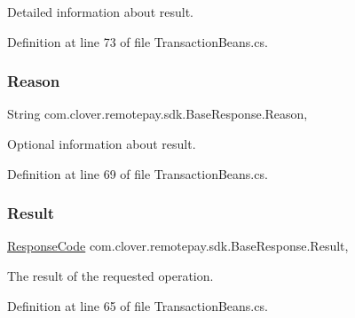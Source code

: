 Detailed information about result. 



Definition at line 73 of file Transaction\+Beans.\+cs.

\mbox{\label{classcom_1_1clover_1_1remotepay_1_1sdk_1_1_base_response_a7d7f71bc43c375b70016d9f024837ccc}} 
\subsubsection{\texorpdfstring{Reason}{Reason}}
{\footnotesize\ttfamily String com.\+clover.\+remotepay.\+sdk.\+Base\+Response.\+Reason\hspace{0.3cm}{\ttfamily [get]}, {\ttfamily [set]}}



Optional information about result. 



Definition at line 69 of file Transaction\+Beans.\+cs.

\mbox{\label{classcom_1_1clover_1_1remotepay_1_1sdk_1_1_base_response_a53831dfbfa294ff337b8e9f745e163ad}} 
\subsubsection{\texorpdfstring{Result}{Result}}
{\footnotesize\ttfamily \hyperlink{namespacecom_1_1clover_1_1remotepay_1_1sdk_ad35c0938efdc4d31c4a040db886ad0f3}{Response\+Code} com.\+clover.\+remotepay.\+sdk.\+Base\+Response.\+Result\hspace{0.3cm}{\ttfamily [get]}, {\ttfamily [set]}}



The result of the requested operation. 



Definition at line 65 of file Transaction\+Beans.\+cs.

